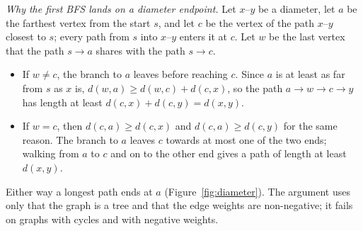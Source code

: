 \emph{Why the first BFS lands on a diameter endpoint.} Let $x$--$y$ be a diameter, let $a$ be the farthest vertex from the start
$s$, and let $c$ be the vertex of the path $x$--$y$ closest to $s$; every path from $s$ into $x$--$y$ enters it at $c$. Let $w$ be
the last vertex that the path $s \to a$ shares with the path $s \to c$.
\begin{itemize}
  \item If $w \ne c$, the branch to $a$ leaves before reaching $c$. Since $a$ is at least as far from $s$ as $x$ is,
        $d(w, a) \ge d(w, c) + d(c, x)$, so the path $a \to w \to c \to y$ has length at least $d(c, x) + d(c, y) = d(x, y)$.
  \item If $w = c$, then $d(c, a) \ge d(c, x)$ and $d(c, a) \ge d(c, y)$ for the same reason. The branch to $a$ leaves $c$ towards
        at most one of the two ends; walking from $a$ to $c$ and on to the other end gives a path of length at least $d(x, y)$.
\end{itemize}
Either way a longest path ends at $a$ (Figure~\ref{fig:diameter}). The argument uses only that the graph is a tree and that the
edge weights are non-negative; it fails on graphs with cycles and with negative weights.

